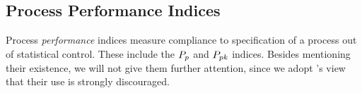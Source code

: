 \subsection{Process Performance Indices}
Process \emph{performance} indices measure compliance to specification of a process out of statistical control. 
These include the $P_{p}$ and $P_{pk}$ indices. 
Besides mentioning their existence, we will not give them further attention, since we adopt \cite{montgomery_introduction_2007}'s view that their use is strongly discouraged. 
